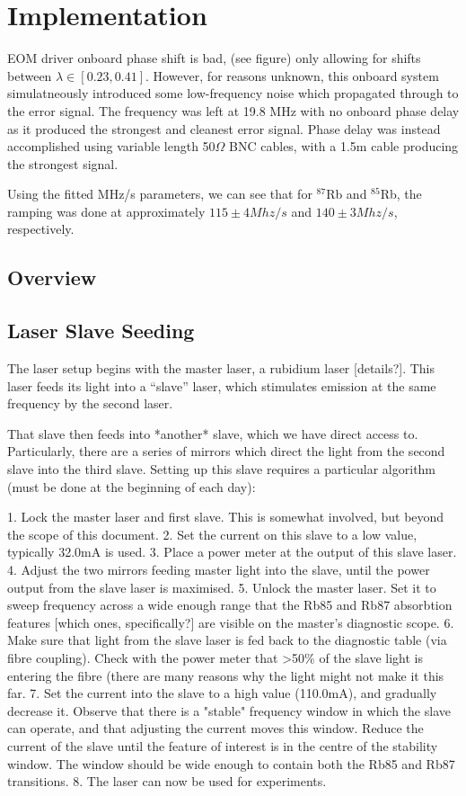 \newpage
\section{Implementation}

EOM driver onboard phase shift is bad, (see figure) only allowing for shifts between $\lambda \in [0.23, 0.41]$. However, for reasons unknown, this onboard system simulatneously introduced some low-frequency noise which propagated through to the error signal. The frequency was left at 19.8 MHz with no onboard phase delay as it produced the strongest and cleanest error signal. Phase delay was instead accomplished using variable length 50$\Omega$ BNC cables, with a 1.5m cable producing the strongest signal.

Using the fitted MHz/s parameters, we can see that for $^{87}$Rb and $^{85}$Rb, the ramping was done at approximately $115 \pm 4 Mhz/s$ and $140 \pm 3 Mhz/s$, respectively.

\subsection{Overview}

\subsection{Laser Slave Seeding}

The laser setup begins with the master laser, a rubidium laser [details?].  This laser feeds its light into a ``slave'' laser, which stimulates emission at the same frequency by the second laser.

That slave then feeds into *another* slave, which we have direct access to.  Particularly, there are a series of mirrors which direct the light from the second slave into the third slave.  Setting up this slave requires a particular algorithm (must be done at the beginning of each day):

 1. Lock the master laser and first slave.  This is somewhat involved, but beyond the scope of this document.
 2. Set the current on this slave to a low value, typically 32.0mA is used.
 3. Place a power meter at the output of this slave laser.
 4. Adjust the two mirrors feeding master light into the slave, until the power output from the slave laser is maximised.
 5. Unlock the master laser.  Set it to sweep frequency across a wide enough range that the Rb85 and Rb87 absorbtion features [which ones, specifically?] are visible on the master's diagnostic scope.
 6. Make sure that light from the slave laser is fed back to the diagnostic table (via fibre coupling).  Check with the power meter that >50\% of the slave light is entering the fibre (there are many reasons why the light might not make it this far.
 7. Set the current into the slave to a high value (110.0mA), and gradually decrease it.  Observe that there is a "stable" frequency window in which the slave can operate, and that adjusting the current moves this window.  Reduce the current of the slave until the feature of interest is in the centre of the stability window.  The window should be wide enough to contain both the Rb85 and Rb87 transitions.
 8. The laser can now be used for experiments.

